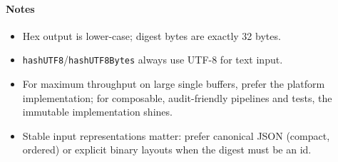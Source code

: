 \documentclass{article}
\begin{document}
\paragraph{Notes}
\begin{itemize}
  \item Hex output is lower-case; digest bytes are exactly 32 bytes.
  \item \texttt{hashUTF8}/\texttt{hashUTF8Bytes} always use UTF-8 for text input.
  \item For maximum throughput on large single buffers, prefer the platform implementation; for composable, audit-friendly pipelines and tests, the immutable implementation shines.
  \item Stable input representations matter: prefer canonical JSON (compact, ordered) or explicit binary layouts when the digest must be an id.
\end{itemize}

\clearpage
\appendix
\end{document}
